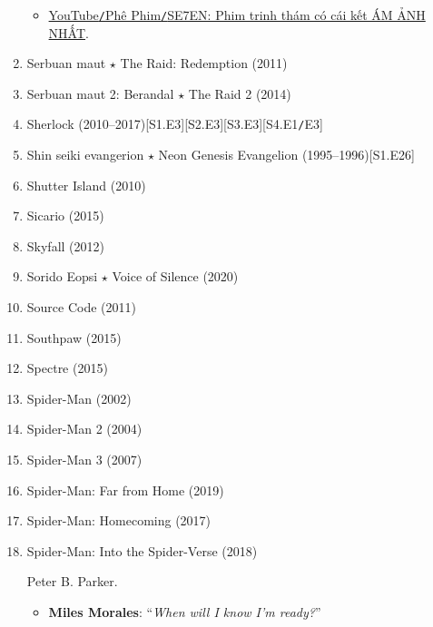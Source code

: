 \documentclass{article}
\begin{document}
\begin{enumerate}
	\begin{itemize}
		\item \href{https://www.youtube.com/watch?v=mL9aHJDGDrM}{YouTube{\tt/}Phê Phim{\tt/}SE7EN: Phim trinh thám có cái kết ÁM ẢNH NHẤT}.
	\end{itemize}
	\item {\sc Serbuan maut $\star$ The Raid: Redemption} (2011)
	\item {\sc Serbuan maut 2: Berandal $\star$ The Raid 2} (2014)
	\item {\sc Sherlock} (2010--2017)\hfill[S1.E3][S2.E3][S3.E3][S4.E1{\tt/}E3]
	\item Shin seiki evangerion $\star$ Neon Genesis Evangelion (1995--1996)\hfill[S1.E26]
	\item {\sc Shutter Island} (2010)
	\item {\sc Sicario} (2015)
	\item {\sc Skyfall} (2012)
	\item {\sc Sorido Eopsi $\star$ Voice of Silence} (2020)
	\item {\sc Source Code} (2011)
	\item {\sc Southpaw} (2015)
	\item {\sc Spectre} (2015)
	\item {\sc Spider-Man} (2002)
	\item {\sc Spider-Man 2} (2004)
	\item {\sc Spider-Man 3} (2007)
	\item {\sc Spider-Man: Far from Home} (2019)
	\item {\sc Spider-Man: Homecoming} (2017)
	\item {\sc Spider-Man: Into the Spider-Verse} (2018)
	
	{\sc Peter B. Parker.}
	\begin{itemize}
		\item {\bf Miles Morales}: ``{\it When will I know I'm ready?}''
		

\end{itemize}
\end{enumerate}
\end{document}
